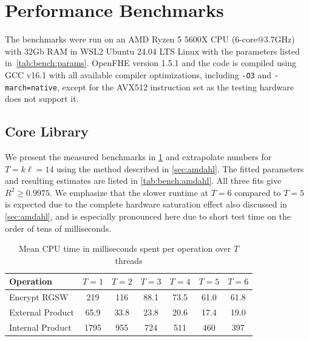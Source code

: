 \section{Performance Benchmarks}
\label{sec:results:benchmarks}
The benchmarks were run on an AMD Ryzen 5 5600X CPU (6-core{@}3.7GHz) with 32Gb RAM in WSL2 Ubuntu 24.04 LTS Linux with the parameters listed in~\autoref{tab:bench:params}.
OpenFHE version 1.5.1 and the code is compiled using GCC v16.1 with all available compiler optimizations, including \texttt{-O3} and \texttt{-march=native}, except for the AVX512 instruction set as the testing hardware does not support it.

\vspace{4pt}
\subsection{Core Library}
We present the measured benchmarks in \cref{tab:bench:rgsw} and extrapolate numbers for $T=k\ell=14$ using the method described in \cref{sec:amdahl}. The fitted parameters and resulting estimates are listed in \cref{tab:bench:amdahl}. All three fits give $R^2 \geq 0.9975$. We emphasize that the slower runtime at $T=6$ compared to $T=5$ is expected due to the complete hardware saturation effect also discussed in \cref{sec:amdahl}, and is especially pronounced here due to short test time on the order of tens of milliseconds.



\begin{table}[H]
    \caption{Mean CPU time in milliseconds spent per operation over $T$ threads}
    \label{tab:bench:rgsw}
    \centering
    \begin{tabular}{lcccccc}
        \toprule
        \textbf{Operation}  & \textbf{$T = 1$} & \textbf{$T = 2$} & \textbf{$T = 3$} & \textbf{$T = 4$} & \textbf{$T = 5$} & \textbf{$T = 6$} \\
        \midrule
        Encrypt RGSW        & \num{219}  & \num{116}  & \num{88.1} & \num{73.5} & \num{61.0} & \num{61.8} \\
        External Product    & \num{65.9} & \num{33.8} & \num{23.8} & \num{20.6} & \num{17.4} & \num{19.0} \\
        Internal Product    & \num{1795} & \num{955}  & \num{724}  & \num{511}  & \num{460}  & \num{397}  \\
        \bottomrule
    \end{tabular}
\end{table}

